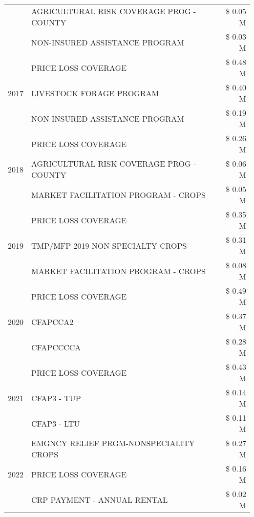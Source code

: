 \begin{tabular}{llr}
 & AGRICULTURAL RISK COVERAGE PROG - COUNTY & \$ 0.05 M \\
 & NON-INSURED ASSISTANCE PROGRAM & \$ 0.03 M \\
\cline{1-3}
\multirow[t]{3}{*}{2017} & PRICE LOSS COVERAGE & \$ 0.48 M \\
 & LIVESTOCK FORAGE PROGRAM & \$ 0.40 M \\
 & NON-INSURED ASSISTANCE PROGRAM & \$ 0.19 M \\
\cline{1-3}
\multirow[t]{3}{*}{2018} & PRICE LOSS COVERAGE & \$ 0.26 M \\
 & AGRICULTURAL RISK COVERAGE PROG - COUNTY & \$ 0.06 M \\
 & MARKET FACILITATION PROGRAM - CROPS & \$ 0.05 M \\
\cline{1-3}
\multirow[t]{3}{*}{2019} & PRICE LOSS COVERAGE & \$ 0.35 M \\
 & TMP/MFP 2019 NON SPECIALTY CROPS & \$ 0.31 M \\
 & MARKET FACILITATION PROGRAM - CROPS & \$ 0.08 M \\
\cline{1-3}
\multirow[t]{3}{*}{2020} & PRICE LOSS COVERAGE & \$ 0.49 M \\
 & CFAPCCA2 & \$ 0.37 M \\
 & CFAPCCCCA & \$ 0.28 M \\
\cline{1-3}
\multirow[t]{3}{*}{2021} & PRICE LOSS COVERAGE & \$ 0.43 M \\
 & CFAP3 - TUP & \$ 0.14 M \\
 & CFAP3 - LTU & \$ 0.11 M \\
\cline{1-3}
\multirow[t]{3}{*}{2022} & EMGNCY RELIEF PRGM-NONSPECIALITY CROPS & \$ 0.27 M \\
 & PRICE LOSS COVERAGE & \$ 0.16 M \\
 & CRP PAYMENT - ANNUAL RENTAL & \$ 0.02 M \\
\cline{1-3}
\bottomrule
\end{tabular}
